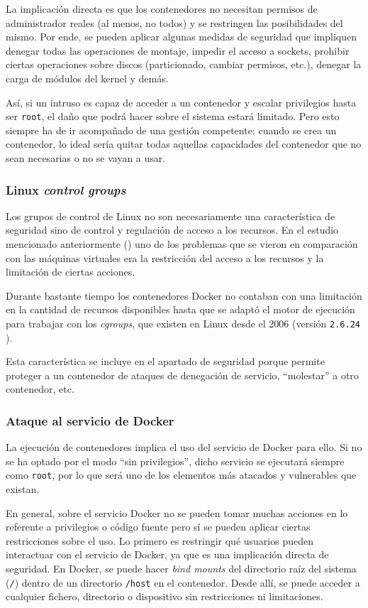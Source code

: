 La implicación directa es que los contenedores no necesitan permisos de administrador
reales (al menos, no todos) y se restringen las posibilidades del mismo. Por ende,
se pueden aplicar algunas medidas de seguridad que impliquen denegar todas las 
operaciones de montaje, impedir el acceso a sockets, prohibir ciertas operaciones
sobre discos (particionado, cambiar permisos, etc.), denegar la carga de módulos
del kernel y demás.

Así, si un intruso es capaz de acceder a un contenedor y escalar privilegios hasta
ser \texttt{root}, el daño que podrá hacer sobre el sistema estará limitado. Pero
esto siempre ha de ir acompañado de una gestión competente: cuando se crea un
contenedor, lo ideal sería quitar todas aquellas capacidades del contenedor que
no sean necesarias o no se vayan a usar.

\subsubsection*{Linux \textit{control groups}}
Los grupos de control de Linux no son necesariamente una característica de seguridad
sino de control y regulación de acceso a los recursos. En el estudio mencionado
anteriormente (\autocite{sunSecurityNamespaceMaking2018}) uno de los problemas
que se vieron en comparación con las máquinas virtuales era la restricción del
acceso a los recursos y la limitación de ciertas acciones.

Durante bastante tiempo los contenedores Docker no contaban con una limitación en
la cantidad de recursos disponibles hasta que se adaptó el motor de ejecución
para trabajar con los \textit{cgroups}, que existen en Linux desde el 2006
(versión \texttt{2.6.24} \autocite{DockerSecurity2021}).

Esta característica se incluye en el apartado de seguridad porque permite
proteger a un contenedor de ataques de denegación de servicio, ``molestar'' a otro
contenedor, etc.

\subsubsection*{Ataque al servicio de Docker}
La ejecución de contenedores implica el uso del servicio de Docker para ello. Si
no se ha optado por el modo ``sin privilegios'', dicho servicio se ejecutará siempre
como \texttt{root}, por lo que será uno de los elementos más atacados
y vulnerables que existan.

En general, sobre el servicio Docker no se pueden tomar muchas acciones en lo
referente a privilegios o código fuente pero sí se pueden aplicar ciertas restricciones
sobre el uso. Lo primero es restringir qué usuarios pueden interactuar con el
servicio de Docker, ya que es una implicación directa de seguridad. En Docker,
se puede hacer \textit{bind mounts} del directorio raíz del sistema (\texttt{/})
dentro de un directorio \texttt{/host} en el contenedor. Desde allí, se puede
acceder a cualquier fichero, directorio o dispositivo sin restricciones ni
limitaciones.

